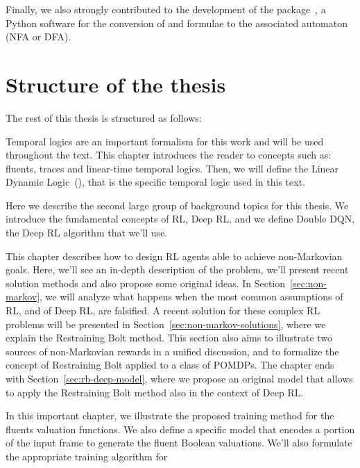 Finally, we also strongly contributed to the development of the 
package~\cite{bib:flloat}, a Python software for the conversion of \ltl{} and
\ldl{} formulae to the associated automaton (NFA or DFA).


\section{Structure of the thesis}

The rest of this thesis is structured as follows:
\begin{description}[style=nextline]
	\item[\ref{ch:logics}~--~\nameref{ch:logics}]
		Temporal logics are an important formalism for this work and will be used
		throughout the text. This chapter introduces the reader to concepts such
		as: fluents, traces and linear-time temporal logics. Then, we will define
		the Linear Dynamic Logic~(\ldl{}), that is the specific temporal logic
		used in this text.
	\item[\ref{ch:rl}~--~\nameref{ch:rl}]
		Here we describe the second large group of background topics for this
		thesis. We introduce the fundamental concepts of RL, Deep RL, and we
		define Double DQN, the Deep RL algorithm that we'll use.
	\item[\ref{ch:nonmarkovrl}~--~\nameref{ch:nonmarkovrl}]
		This chapter describes how to design RL agents able to achieve
		non-Markovian goals. Here, we'll see an in-depth description of the
		problem, we'll present recent solution methods and also propose some
		original ideas. In Section~\ref{sec:non-markov}, we will analyze what
		happens when the most common assumptions of RL, and of Deep RL, are
		falsified. A recent solution for these complex RL problems will be
		presented in Section~\ref{sec:non-markov-solutions}, where we explain the
		Restraining Bolt method. This section also aims to illustrate two sources
		of non-Markovian rewards in a unified discussion, and to formalize the
		concept of Restraining Bolt applied to a class of POMDPs. The chapter ends
		with Section~\ref{sec:rb-deep-model}, where we propose an original model
		that allows to apply the Restraining Bolt method also in the context of
		Deep RL.
	\item[\ref{ch:fluents}~--~\nameref{ch:fluents}]
		In this important chapter, we illustrate the proposed training method for
		the fluents valuation functions. We also define a specific model that
		encodes a portion of the input frame to generate the fluent Boolean
		valuations.  We'll also formulate the appropriate training algorithm for

\end{description}
